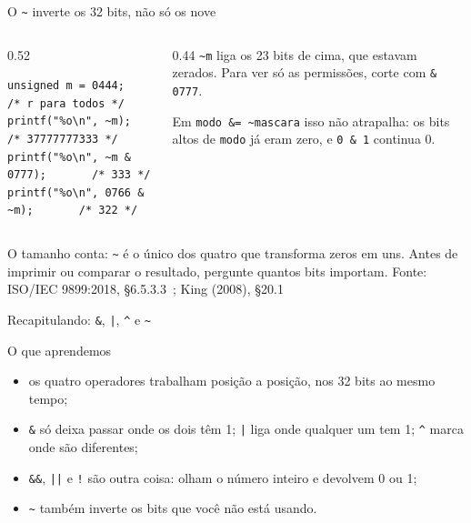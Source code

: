 \documentclass[aspectratio=169]{beamer}
\newcommand{\til}{\textasciitilde}
\newcommand{\cir}{\textasciicircum}
\newcommand{\fonte}[1]{\vfill\hfill{\scriptsize\textcolor{UFSGray}{Fonte: #1}}}
\begin{document}
\begin{frame}[fragile]{O \texttt{\til} inverte os 32 bits, não só os nove}
  \begin{columns}[c]
    \begin{column}{0.52\textwidth}
\begin{lstlisting}[style=codC]
unsigned m = 0444;      /* r para todos */
printf("%o\n", ~m);     /* 37777777333 */
printf("%o\n", ~m & 0777);       /* 333 */
printf("%o\n", 0766 & ~m);       /* 322 */
\end{lstlisting}
    \end{column}
    \begin{column}{0.44\textwidth}
      \small \texttt{\til m} liga os 23 bits de cima, que estavam zerados.
      Para ver só as permissões, corte com \texttt{\& 0777}.

      \medskip
      Em \texttt{modo \&= \til mascara} isso não atrapalha: os bits altos de
      \texttt{modo} já eram zero, e \texttt{0 \& 1} continua 0.
    \end{column}
  \end{columns}
  \medskip
  \small O tamanho conta: \texttt{\til} é o único dos quatro que transforma
  zeros em uns. Antes de imprimir ou comparar o resultado, pergunte quantos
  bits importam.
  \fonte{ISO/IEC 9899:2018, §6.5.3.3~\cite{iso2018c17};
    King (2008), §20.1~\cite{king2008c}}
\end{frame}

\begin{frame}{Recapitulando: \texttt{\&}, \texttt{|}, \texttt{\cir} e \texttt{\til}}
  \begin{block}{O que aprendemos}
    \begin{itemize}
      \item os quatro operadores trabalham posição a posição, nos 32 bits
        ao mesmo tempo;
      \item \texttt{\&} só deixa passar onde os dois têm 1; \texttt{|} liga
        onde qualquer um tem 1; \texttt{\cir} marca onde são diferentes;
      \item \texttt{\&\&}, \texttt{||} e \texttt{!} são outra coisa: olham o
        número inteiro e devolvem 0 ou 1;
      \item \texttt{\til} também inverte os bits que você não está usando.
    \end{itemize}
  \end{block}
\end{frame}

\end{document}
